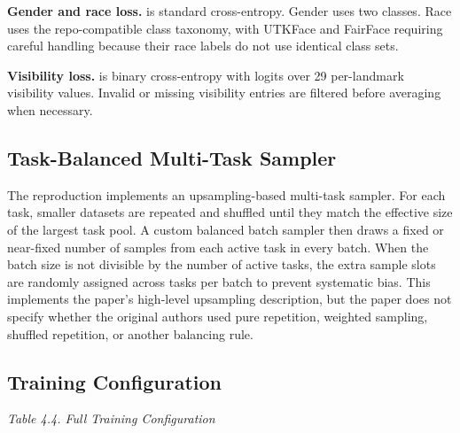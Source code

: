 \documentclass[11pt]{article}
\begin{document}
\textbf{Gender and race loss.}  is standard cross-entropy. Gender uses two classes. Race uses the repo-compatible class taxonomy, with UTKFace and FairFace requiring careful handling because their race labels do not use identical class sets.


\textbf{Visibility loss.}  is binary cross-entropy with logits over 29 per-landmark visibility values. Invalid or missing visibility entries are filtered before averaging when necessary.


\subsection{Task-Balanced Multi-Task Sampler}


The reproduction implements an upsampling-based multi-task sampler. For each task, smaller datasets are repeated and shuffled until they match the effective size of the largest task pool. A custom balanced batch sampler then draws a fixed or near-fixed number of samples from each active task in every batch. When the batch size is not divisible by the number of active tasks, the extra sample slots are randomly assigned across tasks per batch to prevent systematic bias. This implements the paper's high-level upsampling description, but the paper does not specify whether the original authors used pure repetition, weighted sampling, shuffled repetition, or another balancing rule.


\subsection{Training Configuration}


\emph{Table 4.4. Full Training Configuration}
\end{document}
